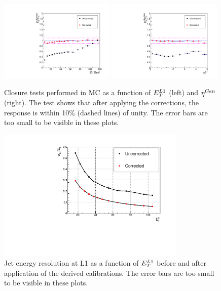 \begin{figure}
\begin{center}
\includegraphics[width=0.49\textwidth]{detector/l1jet/rspvspt.pdf}
\includegraphics[width=0.49\textwidth]{detector/l1jet/rspvseta.pdf}
\end{center}
\caption{Closure tests performed in MC as a function of $E_{T}^{L1}$ (left) and $\eta^{Gen}$ (right). 
The test shows that after applying the corrections, the response is within 10\% (dashed lines) of unity. 
The error bars are too small to be visible in these plots.}
\label{fig:closure}
\end{figure}

\begin{figure}
\begin{center}
\includegraphics[width=0.8\textwidth]{detector/l1jet/MCresolution.pdf}
\end{center}
\caption{Jet energy resolution at L1 as a function of $E_{T}^{L1}$ before and after application of the derived calibrations.
 The error bars are too small to be visible in these plots.}
\label{fig:mcresolutionl1}
\end{figure}


